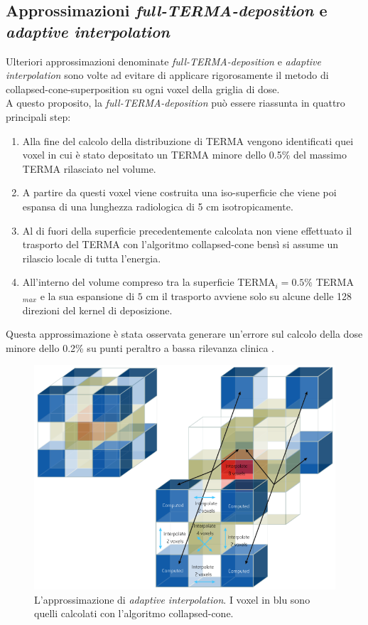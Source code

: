 {\subsection{Approssimazioni \textit{full-TERMA-deposition} e \textit{adaptive interpolation}}
Ulteriori approssimazioni denominate \textit{full-TERMA-deposition} e \textit{adaptive interpolation} sono volte ad evitare di applicare rigorosamente il metodo di collapsed-cone-superposition su ogni voxel della griglia di dose.\\
A questo proposito, la \textit{full-TERMA-deposition} può essere riassunta in quattro principali step:
\begin{enumerate}
\item Alla fine del calcolo della distribuzione di TERMA vengono identificati quei voxel in cui è stato depositato un TERMA minore dello 0.5\% del massimo TERMA rilasciato nel volume.
\item A partire da questi voxel viene costruita una iso-superficie che viene poi espansa di una lunghezza radiologica di 5 cm isotropicamente.
\item Al di fuori della superficie precedentemente calcolata non viene effettuato il trasporto del TERMA con l'algoritmo collapsed-cone bensì si assume un rilascio locale di tutta l'energia.
\item All'interno del volume compreso tra la superficie TERMA$_i= 0.5\%$ TERMA$_{max}$ e la sua espansione di $5$ cm  il trasporto avviene solo su alcune delle 128 direzioni del kernel di deposizione. 
\end{enumerate}
Questa approssimazione è stata osservata generare un'errore sul calcolo della dose minore dello 0.2\% su punti peraltro a bassa rilevanza clinica \cite{RaySearchLaboratories2014}.\\

\begin{figure}
\centering
\includegraphics[width=\textwidth]{./cap1/dose_interp.png}
\caption{L'approssimazione di \textit{adaptive interpolation}. I voxel in blu sono quelli calcolati con l'algoritmo collapsed-cone.}
\label{fig:dose_interp}
\end{figure}

}
